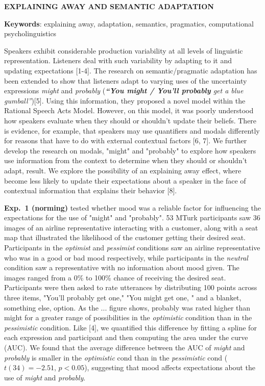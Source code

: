 \documentclass[11pt]{article}
\begin{document}
\thispagestyle{empty}
\begin{center} \textbf{EXPLAINING AWAY AND SEMANTIC ADAPTATION}  \\
\end{center}
\vspace{-1em}
\noindent \textbf{Keywords}: explaining away, adaptation, semantics, pragmatics, computational psycholinguistics


\noindent Speakers exhibit considerable production variability at all levels of linguistic representation. Listeners deal with such variability by adapting to it and updating expectations [1-4]. The research on semantic/pragmatic adaptation has been extended to show that listeners adapt to varying uses of the uncertainty expressions \textit{might} and \textit{probably} (\emph{\textbf{``You might / You'll probably} get a blue gumball''})[5]. Using this information, they proposed a novel model within the Rational Speech Acts Model. However, on this model, it was poorly understood how speakers evaluate when they should or shouldn't update their beliefs. There is evidence, for example, that speakers may use quantifiers and modals differently for reasons that have to do with external contextual factors [6, 7]. We further develop the research on modals, "might" and "probably" to explore how speakers use information from the context to determine when they should or shouldn't adapt, result. We explore the possibility of an explaining away effect, where become less likely to update their expectations about a speaker in the face of contextual information that explains their behavior [8].

\noindent \textbf{Exp.~1 (norming)} tested whether mood was a reliable factor for influencing the expectations for the use of "might" and "probably".  53 MTurk participants saw 36 images of an airline representative interacting with a customer, along with a seat map that illustrated the likelihood of the customer getting their desired seat. Participants in the \textit{optimist} and \textit{pessimist} conditions saw an airline representative who was in a good or bad mood respectively, while participants in the \textit{neutral} condition saw a representative with no information about mood given. The images ranged from a 0\% to 100\% chance of receiving the desired seat. Participants were then asked to rate utterances by distributing 100 points across three items, "You'll probably get one," "You might get one, " and a blanket, something else, option. As the ... figure shows, probably was rated higher than might for a greater range of possibilities in the \textit{optimistic} condition than in the \textit{pessimistic} condition. Like [4], we quantified this difference by fitting a spline for each expression and participant and then computing the area under the curve (AUC). We found that the average difference between the AUC of \textit{might} and \textit{probably} is smaller in the \textit{optimistic} cond than in the \textit{pessimistic} cond ($t(34)=-2.51$, $p < 0.05$), suggesting that mood affects expectations about the use of \textit{might} and \textit{probably}. 
\end{document}

